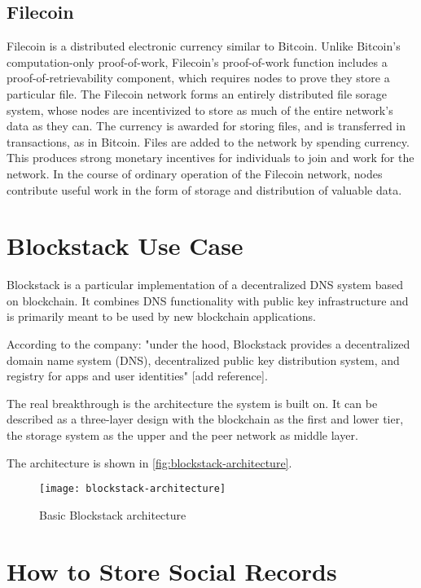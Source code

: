 \subsection*{Filecoin}
Filecoin is a distributed electronic currency similar to Bitcoin. Unlike Bitcoin’s computation-only proof-of-work, Filecoin’s proof-of-work function includes a proof-of-retrievability component, which requires nodes to prove they store a particular file. The Filecoin network forms an entirely distributed file sorage system, whose nodes are incentivized to store as much of the entire network’s data as they can. The currency is awarded for storing files, and is transferred in transactions, as in Bitcoin. Files are added to the network by spending currency. This produces strong monetary incentives for individuals to join and work for the network. In the course of ordinary operation of the Filecoin network, nodes contribute useful work in the form of storage and distribution of valuable data.

\section{Blockstack Use Case}
Blockstack is a particular implementation of a decentralized DNS system based on blockchain. It combines DNS functionality with public key infrastructure and is primarily meant to be used by new blockchain applications.

According to the company: "under the hood, Blockstack provides a decentralized domain name system (DNS), decentralized public key distribution system, and registry for apps and user identities" [add reference].

The real breakthrough is the architecture the system is built on. It can be described as a three-layer design with the blockchain as the first and lower tier, the storage system as the upper and the peer network as middle layer.

The architecture is shown in \ref{fig:blockstack-architecture}.
\begin{figure}[h]
	\centering
  \texttt{[image: blockstack-architecture]}
	\caption{Basic Blockstack architecture}
	\label{fig1}
\end{figure}

\section{How to Store Social Records}
